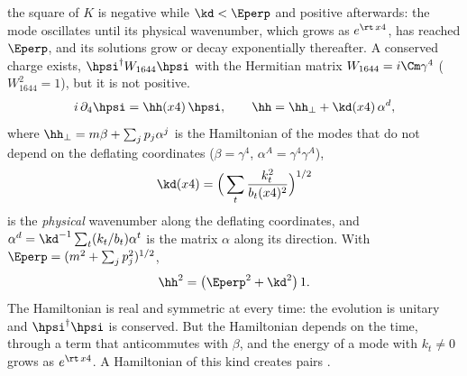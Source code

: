 the square of $K$ is negative while $\kd<\Eperp$ and positive afterwards: the mode oscillates until
its physical wavenumber, which grows as $e^{\rt\,x4}$, has reached $\Eperp$, and its solutions grow
or decay exponentially thereafter. A conserved charge exists, $\hpsi^\dagger W_{1644}\hpsi$ with the
Hermitian matrix $W_{1644}=i\Cm\gamma^{4}$ ($W_{1644}^{2}=1$), but it is not positive.
\begin{equation}
i\,\partial_4\hpsi=\hh(x4)\,\hpsi,\qquad\hh=\hh_\perp+\kd(x4)\,\alpha^{d},
\label{eq:h}
\end{equation}
where $\hh_\perp=m\beta+\sum_jp_j\alpha^{j}$ is the Hamiltonian of the modes that do not depend on
the deflating coordinates ($\beta=\gamma^{4}$, $\alpha^{A}=\gamma^{4}\gamma^{A}$),
\begin{equation}
\kd(x4)=\Big(\sum_t\frac{k_t^{2}}{b_t(x4)^{2}}\Big)^{1/2}
\label{eq:kd}
\end{equation}
is the \emph{physical} wavenumber along the deflating coordinates, and
$\alpha^{d}=\kd^{-1}\sum_t(k_t/b_t)\alpha^{t}$ is the matrix $\alpha$ along its direction. With
$\Eperp=(m^{2}+\sum_jp_j^{2})^{1/2}$,
\begin{equation}
\hh^{2}=\big(\Eperp^{2}+\kd^{2}\big)\,1 .
\label{eq:h2}
\end{equation}
The Hamiltonian is real and symmetric at every time: the evolution is unitary and
$\hpsi^\dagger\hpsi$ is conserved. But the Hamiltonian depends on the time, through a term that
anticommutes with $\beta$, and the energy of a mode with $k_t\neq0$ grows as $e^{\rt\,x4}$. A
Hamiltonian of this kind creates pairs \cite{Parker1969}.

